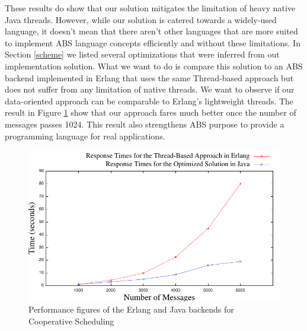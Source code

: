 \par These results do show that our solution mitigates the limitation of heavy native Java threads. However, while our solution is catered towards a widely-used language, it doesn't mean that there aren't other languages that are more suited to implement ABS language concepts efficiently and without these limitations. In Section \ref{scheme} we listed several optimizations that were inferred from out implementation solution. What we want to do is compare this solution to an ABS backend implemented in Erlang that uses the same Thread-based approach but does not suffer from any limitation of native threads. We want to observe if our data-oriented approach can be comparable to Erlang's lightweight threads. The result in Figure \ref{ej} show that our approach fares much better once the number of messages passes 1024. This result also strengthens ABS purpose to provide a programming language for real applications.

\begin{figure}
	\label{ej}
	\centering
	\includegraphics[scale=1]{erlj8.pdf}
	\caption{Performance figures of the Erlang and Java backends for Cooperative Scheduling}
\end{figure}



